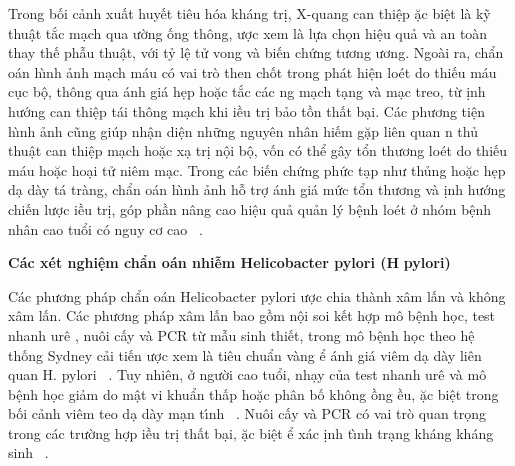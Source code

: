 \documentclass[9pt,twocolumn]{article}
\begin{document}
Trong bối cảnh xuất huy{{\'{\^{e}}}}t ti{\^{e}}u h{\'{o}}a kh\'{a}ng tr\d{i}, X-quang can thi{\^{\d{e}}}p \text{\dj}ặc bi{\^{\d{e}}}t l\`{a} kỹ thu{\^{\d{a}}}t tắc m{\d{a}}ch qua \text{\dj}ường ống th{\^o}ng, \text{\dj}ược xem l\`{a} lựa ch\d{o}n hi{\^{\d{e}}}u quả v\`{a} an to\`{a}n thay th{{\'{\^{e}}}} phẫu thu{\^{\d{a}}}t, với tỷ l{\^{\d{e}}} tử vong v\`{a} bi{{\'{\^{e}}}}n chứng tương \text{\dj}ương. Ngo\`{a}i ra, chẩn \text{\dj}o\'{a}n h\`{\i}nh ảnh m{\d{a}}ch m\'{a}u c{\'{o}} vai tr\`{o} then chốt trong ph\'{a}t hi{\^{\d{e}}}n lo{\'e}t do thi{{\'{\^{e}}}}u m\'{a}u c\d{u}c b{\^{\d{o}}}, th{\^o}ng qua \text{\dj}\'{a}nh gi\'{a} h\d{e}p hoặc tắc c\'{a}c ng m{\d{a}}ch t{\d{a}}ng v\`{a} m{\d{a}}c treo, từ  \text{\dj}\d{i}nh hướng can thi{\^{\d{e}}}p t\'{a}i th{\^o}ng m{\d{a}}ch khi \text{\dj}iều tr\d{i} bảo tồn thất b{\d{a}}i. C\'{a}c phương ti{\^{\d{e}}}n h\`{\i}nh ảnh c{\~{u}}ng gi\'{u}p nh{\^{\d{a}}}n di{\^{\d{e}}}n những nguy{\^{e}}n nh\^{a}n hi{{\'{\^{e}}}}m gặp li{\^{e}}n quan n thủ thu{\^{\d{a}}}t can thi{\^{\d{e}}}p m{\d{a}}ch hoặc x{\d{a}} tr\d{i} n{\^{\d{o}}}i b{\^{\d{o}}}, vốn c{\'{o}} thể g\^{a}y tổn thương lo{\'e}t do thi{{\'{\^{e}}}}u m\'{a}u hoặc ho{\d{a}}i tử ni{\^{e}}m m{\d{a}}c. Trong c\'{a}c bi{{\'{\^{e}}}}n chứng phức t{\d{a}}p như thủng hoặc h\d{e}p d{\d{a}} d\`{a}y t\'{a} tr\`{a}ng, chẩn \text{\dj}o\'{a}n h\`{\i}nh ảnh hỗ trợ \text{\dj}\'{a}nh gi\'{a} mức  tổn thương v\`{a} \text{\dj}\d{i}nh hướng chi{{\'{\^{e}}}}n lược \text{\dj}iều tr\d{i}, g{\'{o}}p phần n\^{a}ng cao hi{\^{\d{e}}}u quả quản l\'{y} b{\^{\d{e}}}nh lo{\'e}t ở nh{\'{o}}m b{\^{\d{e}}}nh nh\^{a}n cao tuổi c{\'{o}} nguy cơ cao\unskip~\cite{2901310:34531813,2901310:34531814} .

\textbf{C\'{a}c x{\'e}t nghi{\^{\d{e}}}m chẩn \text{\dj}o\'{a}n nhi{\~{\^e}}m Helicobacter pylori (H} \textbf{pylori)}

C\'{a}c phương ph\'{a}p chẩn \text{\dj}o\'{a}n Helicobacter pylori \text{\dj}ược chia th\`{a}nh x\^{a}m lấn v\`{a} kh{\^o}ng x\^{a}m lấn. C\'{a}c phương ph\'{a}p x\^{a}m lấn bao gồm n{\^{\d{o}}}i soi k{{\'{\^{e}}}}t hợp m{\^o} b{\^{\d{e}}}nh h\d{o}c, test nhanh ur{\^{e}} , nu{\^o}i cấy v\`{a} PCR từ mẫu sinh thi{{\'{\^{e}}}}t, trong  m{\^o} b{\^{\d{e}}}nh h\d{o}c theo h{\^{\d{e}}} thống Sydney cải ti{{\'{\^{e}}}}n \text{\dj}ược xem l\`{a} ti{\^{e}}u chuẩn v\`{a}ng \text{\dj}ể \text{\dj}\'{a}nh gi\'{a} vi{\^{e}}m d{\d{a}} d\`{a}y li{\^{e}}n quan H. pylori\unskip~\cite{2901310:34531808,2901310:34531815} . Tuy nhi{\^{e}}n, ở người cao tuổi,  nh{\d{a}}y của test nhanh ur{\^{e}} v\`{a} m{\^o} b{\^{\d{e}}}nh h\d{o}c giảm do m{\^{\d{a}}}t  vi khuẩn thấp hoặc ph\^{a}n bố kh{\^o}ng \text{\dj}ồng \text{\dj}ều, \text{\dj}ặc bi{\^{\d{e}}}t trong bối cảnh vi{\^{e}}m teo d{\d{a}} d\`{a}y m{\d{a}}n t\'{\i}nh\unskip~\cite{2901310:34531816} . Nu{\^o}i cấy v\`{a} PCR c{\'{o}} vai tr\`{o} quan tr\d{o}ng trong c\'{a}c trường hợp \text{\dj}iều tr\d{i} thất b{\d{a}}i, \text{\dj}ặc bi{\^{\d{e}}}t \text{\dj}ể x\'{a}c \text{\dj}\d{i}nh t\`{\i}nh tr{\d{a}}ng kh\'{a}ng kh\'{a}ng sinh\unskip~\cite{2901310:34531808} .
\end{document}
